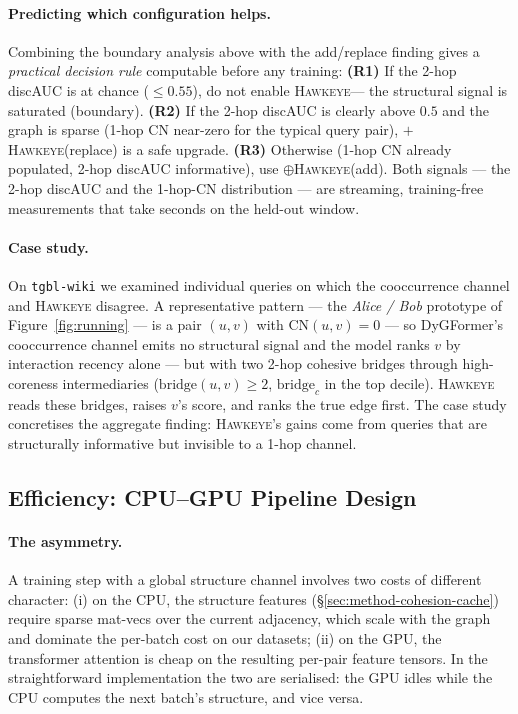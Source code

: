 \documentclass[sigconf,nonacm,review]{acmart}
\newcommand{\method}{\textsc{Hawkeye}\xspace}
\begin{document}
\paragraph{Predicting which configuration helps.}
Combining the boundary analysis above with the add/replace finding gives a
\emph{practical decision rule} computable before any training:
\textbf{(R1)} If the 2-hop discAUC is at chance ($\le 0.55$), do not enable
\method --- the structural signal is saturated (boundary).
\textbf{(R2)} If the 2-hop discAUC is clearly above $0.5$ and the graph is
sparse (1-hop CN near-zero for the typical query pair),
$+$\method (replace) is a safe upgrade.
\textbf{(R3)} Otherwise (1-hop CN already populated, 2-hop discAUC
informative), use $\oplus$\method (add).
Both signals --- the 2-hop discAUC and the 1-hop-CN distribution --- are
streaming, training-free measurements that take seconds on the held-out
window.

\paragraph{Case study.}
On \texttt{tgbl-wiki} we examined individual queries on which the cooccurrence
channel and \method disagree. A representative pattern --- the \emph{Alice /
Bob} prototype of Figure~\ref{fig:running} --- is a pair $(u,v)$ with
$\mathrm{CN}(u,v)=0$ --- so DyGFormer's cooccurrence channel emits no
structural signal and the model ranks $v$ by interaction recency alone --- but
with two 2-hop cohesive bridges through high-coreness intermediaries
($\mathrm{bridge}(u,v)\!\ge\!2$, $\mathrm{bridge}_c$ in the top decile).
\method reads these bridges, raises $v$'s score, and ranks the true edge
first. The case study concretises the aggregate finding: \method's gains
come from queries that are structurally informative but invisible to a
1-hop channel.

\subsection{Efficiency: CPU--GPU Pipeline Design}
\label{sec:efficiency}

\paragraph{The asymmetry.}
A training step with a global structure channel involves two costs of different
character: (i) on the CPU, the structure features
(\S\ref{sec:method-cohesion-cache}) require sparse mat-vecs over the current
adjacency, which scale with the graph and dominate the per-batch cost on our
datasets; (ii) on the GPU, the transformer attention is cheap on the resulting
per-pair feature tensors. In the straightforward implementation the two are
serialised: the GPU idles while the CPU computes the next batch's structure,
and vice versa.
\end{document}
